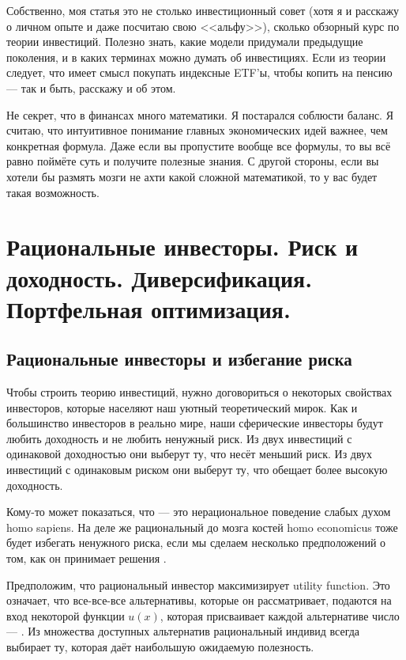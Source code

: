 Собственно, моя статья это не столько инвестиционный совет (хотя я и расскажу о
личном опыте и даже посчитаю свою <<альфу>>), сколько обзорный курс по теории 
инвестиций. Полезно знать, какие модели придумали предыдущие поколения, и в 
каких терминах можно думать об инвестициях. Если из теории следует, что имеет 
смысл покупать индексные ETF'ы, чтобы копить на пенсию --- так и быть, расскажу и об этом.

Не секрет, что в финансах много математики. Я постарался соблюсти баланс. Я 
считаю, что интуитивное понимание главных экономических идей важнее, чем 
конкретная формула. Даже если вы пропустите вообще все формулы, то вы всё равно 
поймёте суть и получите полезные знания. С другой стороны, если вы хотели бы 
размять мозги не ахти какой сложной математикой, то у вас будет такая возможность.

\section{Рациональные инвесторы. Риск и доходность. Диверсификация. Портфельная
оптимизация.}

\subsection{Рациональные инвесторы и избегание риска}

Чтобы строить теорию инвестиций, нужно договориться о некоторых свойствах 
инвесторов, которые населяют наш уютный теоретический мирок. Как и большинство 
инвесторов в реально мире, наши сферические инвесторы будут любить доходность и 
не любить ненужный риск. Из двух инвестиций с одинаковой доходностью они выберут 
ту, что несёт меньший риск. Из двух инвестиций с одинаковым риском они выберут 
ту, что обещает более высокую доходность.

Кому-то может показаться, что  --- это
нерациональное поведение слабых духом homo sapiens. На деле же рациональный до
мозга костей homo economicus тоже будет избегать ненужного риска, если мы
сделаем несколько предположений о том, как он принимает решения
\cite[ch.~6.1]{bodie2014investments}.
 
Предположим, что рациональный инвестор максимизирует 
{utility function}. Это означает, что все-все-все альтернативы, которые он 
рассматривает, подаются на вход некоторой функции $u(x)$, которая присваивает
каждой альтернативе число --- . Из множества доступных 
альтернатив рациональный индивид всегда выбирает ту, которая даёт наибольшую
ожидаемую полезность.
 
